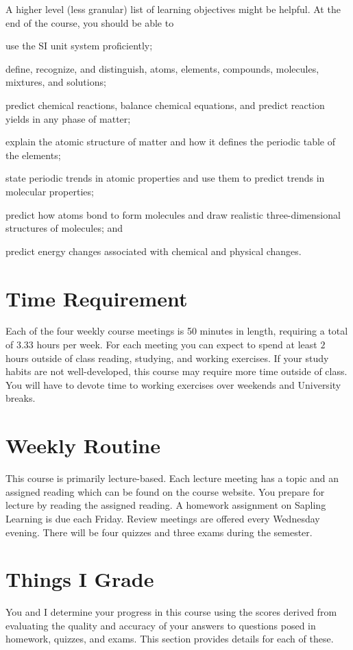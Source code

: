 \documentclass[letterpaper,oneside,onecolumn,11pt,article]{memoir}
\begin{document}
A higher level (less granular) list of learning objectives might be helpful. At the end of the course, you should be able to 
\begin{inparaenum}
\item use the SI unit system proficiently; 
\item define, recognize, and distinguish, atoms, elements, compounds, molecules, mixtures, and solutions; 
\item predict chemical reactions, balance chemical equations, and predict reaction yields in any phase of matter; 
\item explain the atomic structure of matter and how it defines the periodic table of the elements; 
\item state periodic trends in atomic properties and use them to predict trends in molecular properties; 
\item predict how atoms bond to form molecules and draw realistic three-dimensional structures of molecules; and
\item predict energy changes associated with chemical and physical changes.
\end{inparaenum}
\section{Time Requirement}

Each of the four weekly course meetings is 50 minutes in length, requiring a total of $3.33$ hours per week. For each meeting you can expect to spend at least $2$ hours outside of class reading, studying, and working exercises. If your study habits are not well-developed, this course may require more time outside of class. You will have to devote time to working exercises over weekends and University breaks. 
%
%
\section{Weekly Routine}
This course is primarily lecture-based. Each lecture meeting has a topic and an assigned reading which can be found on the course website. You prepare for lecture by reading the assigned reading. A homework assignment on Sapling Learning is due each Friday. Review meetings are offered every Wednesday evening. There will be four quizzes and three exams during the semester.
%
%
\section{Things I Grade}
You and I determine your progress in this course using the scores derived from evaluating the quality and accuracy of your answers to questions posed in homework, quizzes, and exams. This section provides details for each of these.
%
%
\end{document}
